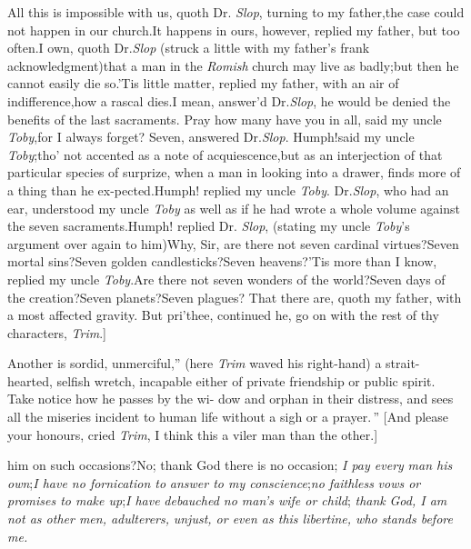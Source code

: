 \documentclass{article}
\begin{document}
All this is impossible with us, quoth Dr.\@
\textit{Slop}, turning to my father,\tsk the case could
not happen in our church.\tsh It\break
happens in ours,
however, replied my father, but too often.\tsh I own,
quoth Dr.\break \textit{Slop} (struck a little with my
father’s frank acknowledgment)\tsk that a man in the
\textit{Romish} church may live as badly;\tsk\break but
then he cannot easily die so.\tsh ’Tis little matter,
replied my father, with an air of indifference,\tsk how
a rascal dies.\tsk\break I mean, answer’d Dr.\@ \textit{Slop},
he would be denied the benefits of the last
sacraments.\break
\tsk Pray how many have you in all, said my uncle
\textit{Toby},\tsk for I always forget?\tsk\break
Seven, answered Dr.\@ \textit{Slop}.\tsk
Humph!\tsk\break said my
uncle \textit{Toby};\tsk tho’ not accented as a note of
acquiescence,\tsk but as an interjection of that
particular species of surprize, when a man in looking
into a drawer, finds more of a thing than he
ex-\break pected.\tsk Humph! replied my uncle \textit{Toby}.
Dr.\@ \textit{Slop}, who had an ear, understood my uncle
\textit{Toby} as well as if he had wrote a whole volume
against the seven sacraments.\tsh Humph! replied Dr.\@
\textit{Slop}, (stating my uncle \textit{Toby}’s
argument over again to him)\tsh Why, Sir, are there not
seven cardinal virtues?\tsh Seven mortal sins?\tsh Seven
golden candlesticks?\tsh Seven heavens?\tsh ’Tis\break
more than I know, replied my uncle\break
\textit{Toby}.\tsh Are
there not seven wonders of the world?\tsh Seven days of
the creation?\tsh Seven planets?\tsh Seven plagues?\tsh
That there are, quoth my father, with a most affected
gravity. But pri’thee, continued he, go on with the rest
of thy characters, \textit{Trim}.]

\lqq Another is sordid, unmerciful,” (here\break
\textit{Trim} waved his right-hand) \lqq a strait-\break
\lqq hearted, selfish wretch, incapable either\break
\lqq of private friendship or public spirit.\break
\lqq Take notice how he passes by the wi-\break
\lqq dow and orphan in their distress, and\break
\lqq sees all the miseries incident to human\break
\lqq life without a sigh or a prayer.\,” [And
please your honours, cried
\textit{Trim}, I think this a viler man than the other.]

\lqq {}\break
\lqq him on such occasions?\tsh No; thank\break
\lqq God there is no occasion; \textit{I pay every}\break
\lqq \textit{man his own};\textit{\tsk I have no fornication to}\break
\lqq \textit{answer to my conscience};\textit{\tsk no faithless}\break
\lqq \textit{vows or promises to make up};\textit{\tsk I have}\break
\lqq \textit{debauched no man’s wife or child}; \textit{thank}\break
\lqq \textit{God, I am not as other men, adulterers,}\break
\lqq \textit{unjust, or even as this libertine, who}\break
\lqq \textit{stands before me.}
\end{document}
